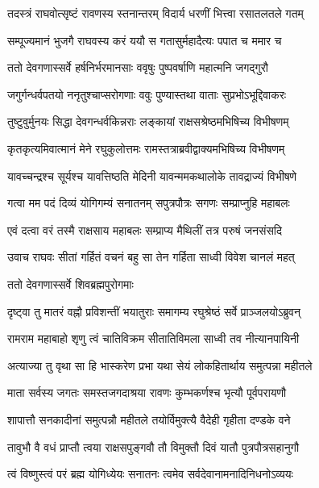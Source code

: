 \twolineshloka
{तदस्त्रं राघवोत्सृष्टं रावणस्य स्तनान्तरम्}
{विदार्य धरणीं भित्त्वा रसातलतले गतम्}%

\twolineshloka
{सम्पूज्यमानं भुजगै राघवस्य करं ययौ}
{स गतासुर्महादैत्यः पपात च ममार च}%

\twolineshloka
{ततो देवगणास्सर्वे हर्षनिर्भरमानसाः}
{ववृषुः पुष्पवर्षाणि महात्मनि जगद्गुरौ}%

\twolineshloka
{जगुर्गन्धर्वपतयो ननृतुश्चाप्सरोगणाः}
{ववुः पुण्यास्तथा वाताः सुप्रभोऽभूद्दिवाकरः}%

\twolineshloka
{तुष्टुवुर्मुनयः सिद्धा देवगन्धर्वकिन्नराः}
{लङ्कायां राक्षसश्रेष्ठमभिषिच्य विभीषणम्}%

\twolineshloka
{कृतकृत्यमिवात्मानं मेने रघुकुलोत्तमः}
{रामस्तत्राब्रवीद्वाक्यमभिषिच्य विभीषणम्}%


\twolineshloka
{यावच्चन्द्रश्च सूर्यश्च यावत्तिष्ठति मेदिनी}
{यावन्ममकथालोके तावद्राज्यं विभीषणे}%

\twolineshloka
{गत्वा मम पदं दिव्यं योगिगम्यं सनातनम्}
{सपुत्रपौत्रः सगणः सम्प्राप्नुहि महाबलः}%


\twolineshloka
{एवं दत्वा वरं तस्मै राक्षसाय महाबलः}
{सम्प्राप्य मैथिलीं तत्र परुषं जनसंसदि}%

\twolineshloka
{उवाच राघवः सीतां गर्हितं वचनं बहु}
{सा तेन गर्हिता साध्वी विवेश चानलं महत्}%

ततो देवगणास्सर्वे शिवब्रह्मपुरोगमाः

\twolineshloka
{दृष्ट्वा तु मातरं वह्नौ प्रविशन्तीं भयातुराः}
{समागम्य रघुश्रेष्ठं सर्वे प्राञ्जलयोऽब्रुवन्}%


\twolineshloka
{रामराम महाबाहो शृणु त्वं चातिविक्रम}
{सीतातिविमला साध्वी तव नीत्यानपायिनी}%

\twolineshloka
{अत्याज्या तु वृथा सा हि भास्करेण प्रभा यथा}
{सेयं लोकहितार्थाय समुत्पन्ना महीतले}%

\twolineshloka
{माता सर्वस्य जगतः समस्तजगदाश्रया}
{रावणः कुम्भकर्णश्च भृत्यौ पूर्वपरायणौ}%

\twolineshloka
{शापात्तौ सनकादीनां समुत्पन्नौ महीतले}
{तयोर्विमुक्त्यै वैदेही गृहीता दण्डके वने}%

\twolineshloka
{तावुभौ वै वधं प्राप्तौ त्वया राक्षसपुङ्गवौ}
{तौ विमुक्तौ दिवं यातौ पुत्रपौत्रसहानुगौ}%

\twolineshloka
{त्वं विष्णुस्त्वं परं ब्रह्म योगिध्येयः सनातनः}
{त्वमेव सर्वदेवानामनादिनिधनोऽव्ययः}%


